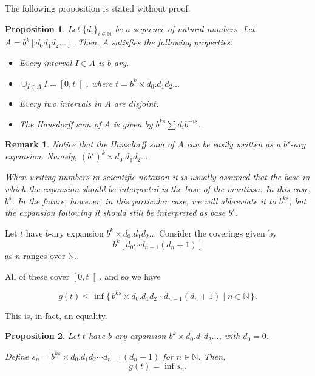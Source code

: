 \documentclass[11pt, reqno]{amsart}
\newcommand{\N}{\mathbb{N}}
\newtheorem{prop}{Proposition}
\newtheorem{remark}{Remark}
\begin{document}
The following proposition is stated without proof.

\begin{prop}
Let $\{d_i\}_{i \in \N}$ be a sequence of natural numbers. Let $A = b^k [d_0 d_1 d_2 \dots]$. Then, $A$ satisfies the following properties:

\begin{itemize}
\item Every interval $I \in A$ is $b$-ary.

\item $\cup_{I \in A} I = \left[ 0, t \right[$, where $t = b^k \times d_0 . d_1 d_2 \dots$

\item Every two intervals in $A$ are disjoint.

\item The Hausdorff sum of $A$ is given by $b^{ks} \sum d_i b^{-is}$.
\end{itemize}

\end{prop}

\begin{remark}
Notice that the Hausdorff sum of $A$ can be easily written as a $b^s$-ary expansion. Namely, $(b^s)^k \times d_0 . d_1 d_ 2 \dots$

When writing numbers in scientific notation it is usually assumed that the base in which the expansion should be interpreted is the base of the mantissa. In this case, $b^s$. In the future, however, in this particular case, we will abbreviate it to $b^{ks}$, but the expansion following it should still be interpreted as base $b^s$.
\end{remark}

Let $t$ have $b$-ary expansion $b^k \times d_0 . d_1 d_2 \dots$ Consider the coverings given by
\[ b^k [d_0 \cdots d_{n-1} (d_n + 1)] \]
as $n$ ranges over $\N$.

All of these cover $\left[0, t\right[$, and so we have

\[ g(t) \leq \inf \{\, b^{ks} \times d_0 . d_1 d_2 \cdots d_{n-1} (d_n + 1) \mid n \in \N\,\}.\]

This is, in fact, an equality.

\begin{prop} \label{ginfs}
Let $t$ have $b$-ary expansion $b^k \times d_0 . d_1 d_2 \dots$, with $d_0 = 0$.

Define $s_n = b^{ks} \times d_0 . d_1 d_2 \cdots d_{n-1} (d_n + 1)$ for $n \in \N$. Then,
\[ g(t) = \inf s_n.\]
\end{prop}
\end{document}
